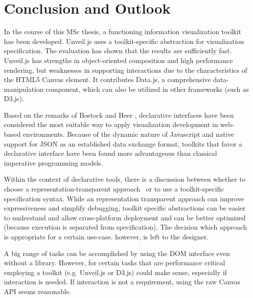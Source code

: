 \chapter{Conclusion and Outlook}
\label{cha:conclusion}


In the course of this MSc thesis, a functioning information visualization toolkit has been developed. Unveil.js uses a toolkit-specific abstraction for visualization specification. The evaluation has shown that the results are sufficiently fast. Unveil.js has strengths in object-oriented composition and high performance rendering, but weaknesses in supporting interactions due to the characteristics of the HTML5 Canvas element. It contributes Data.js, a comprehensive data-manipulation component, which can also be utilized in other frameworks (such as D3.js).


Based on the remarks of Bostock and Heer \cite{Protovis09}, declarative interfaces have been considered the most suitable way to apply visualization development in web-based environments. Because of the dynamic nature of Javascript and native support for JSON as an established data exchange format, toolkits that favor a declarative interface have been found more advantageous than classical imperative programming models.


Within the context of declarative tools, there is a discussion between whether to choose a representation-transparent approach~\cite{D3} or to use a toolkit-specific specification syntax. While an representation transparent approach can improve expressiveness and simplify debugging, toolkit specific abstractions can be easier to understand and allow cross-platform deployment and can be better optimized (because execution is separated from specification). The decision which approach is appropriate for a certain use-case, however, is left to the designer. 

A big range of tasks can be accomplished by using the DOM interface even without a library. However, for certain tasks that are performance critical employing a toolkit (e.g. Unveil.js or D3.js) could make sense, especially if interaction is needed. If interaction is not a requirement, using the raw Canvas API seems reasonable.


